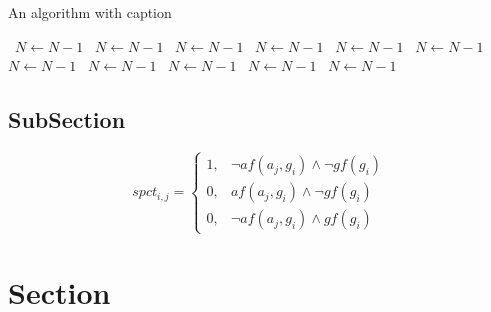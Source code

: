 \documentclass[a4paper]{article}
\begin{document}
\begin{algorithm}
\caption{An algorithm with caption}
\begin{algorithmic}
\    \State $N \gets N - 1$
\    \State $N \gets N - 1$
\    \State $N \gets N - 1$
\    \State $N \gets N - 1$
\    \State $N \gets N - 1$
\    \State $N \gets N - 1$
\    \State $N \gets N - 1$
\    \State $N \gets N - 1$
\    \State $N \gets N - 1$
\    \State $N \gets N - 1$
\    \State $N \gets N - 1$
\EndWhile
\end{algorithmic}
\end{algorithm}

\subsection{SubSection}

\begin{equation}
spct_{i,j} =
\begin{cases}
1, & \text{$\neg af(a_j,g_i) \wedge \neg gf(g_i)$}\\
0, & \text{$af(a_j,g_i) \wedge \neg gf(g_i)$}\\
0, & \text{$\neg af(a_j,g_i) \wedge gf(g_i)$}
\end{cases}
\end{equation}

\section{Section}
\end{document}
